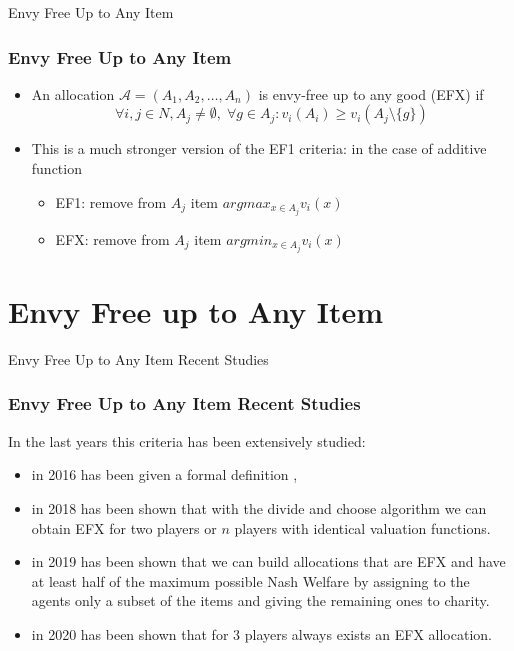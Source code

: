 \begin{frame}{Envy Free Up to Any Item}
\frametitle{Envy Free Up to Any Item}
\begin{itemize}
    \item An allocation $\mathcal{A} = (A_1, A_2, \dots, A_n)$ is envy-free up to any good (EFX) if 
$$\forall i,j\in N,  A_j\ne \emptyset, \; \forall g\in A_j: v_i(A_i)\ge v_i(A_j\setminus \{g\})$$
    \item This is a much stronger version of the EF1 criteria: in the case of additive function 
    \begin{itemize}
        \item EF1: remove from $A_j$ item $argmax_{x\in A_j} v_i(x)$
        \item EFX: remove from $A_j$ item $argmin_{x\in A_j} v_i(x)$
    \end{itemize}
    
\end{itemize}

\end{frame}



\section{Envy Free up to Any Item}
\begin{frame}{Envy Free Up to Any Item Recent Studies}
\frametitle{Envy Free Up to Any Item Recent Studies}
In the last years this criteria has been extensively studied: 
\begin{itemize}
    \item in 2016 has been given a formal definition \cite{DBLP:/CaragiannisKMP016-EFX-PMMS},
    \item in 2018 has been shown that with the divide and choose algorithm  we can obtain EFX for two players or $n$ players with identical valuation functions\cite{DBLP:cut-and-choose-indivisible}.
    \item in 2019 has been shown that we can build allocations that are EFX and have at least half of the maximum possible Nash Welfare by assigning to the agents only a subset of the items and giving the remaining ones to charity\cite{DBLP:efx-charity}.  
    \item in 2020 has been shown that for $3$ players always exists an EFX allocation\cite{DBLP:3p-efx-existance}.
\end{itemize}
\end{frame}

